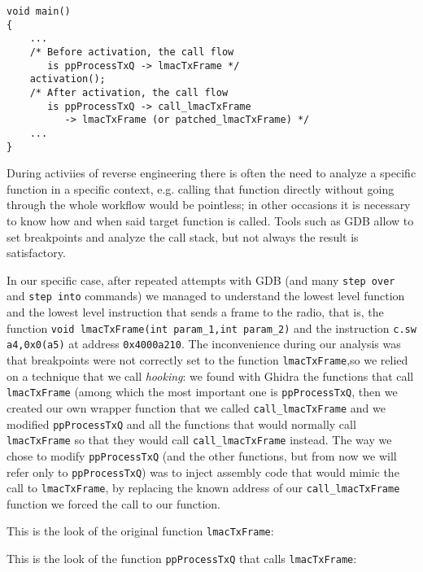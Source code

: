 \newsavebox\funmain
\begin{lrbox}{\funmain}
\begin{lstlisting}
void main()
{
    ...
    /* Before activation, the call flow
       is ppProcessTxQ -> lmacTxFrame */
    activation();
    /* After activation, the call flow
       is ppProcessTxQ -> call_lmacTxFrame
          -> lmacTxFrame (or patched_lmacTxFrame) */
    ...
}
\end{lstlisting}
\end{lrbox}


During activiies of reverse engineering there is often the need to analyze a specific function
in a specific context, e.g. calling that function directly without going through the whole
workflow would be pointless; in other occasions it is necessary to know how and when said target
function is called. Tools such as GDB allow to set breakpoints and analyze the call stack,
but not always the result is satisfactory.

In our specific case, after repeated attempts with GDB (and many \texttt{step over} and \texttt{step into} commands)
we managed to understand the lowest level function and the lowest level instruction that sends a frame to the radio,
that is, the function \texttt{void lmacTxFrame(int param\_1,int param\_2)} and the instruction \texttt{c.sw a4,0x0(a5)}
at address \texttt{0x4000a210}.
The inconvenience during our analysis was that breakpoints were not correctly set to the function \texttt{lmacTxFrame},so we relied on a technique that we call \textit{hooking}: we found with Ghidra the functions that call
\texttt{lmacTxFrame} (among which the most important one is \texttt{ppProcessTxQ}, then we created our own wrapper function that we called \texttt{call\_lmacTxFrame} and we 
modified \texttt{ppProcessTxQ} and all the functions that would normally call \texttt{lmacTxFrame}
so that they would call \texttt{call\_lmacTxFrame} instead. 
The way we chose to modify \texttt{ppProcessTxQ} (and the other functions, but from now we will refer only to
\texttt{ppProcessTxQ}) was to inject assembly code that would mimic the call to \texttt{lmacTxFrame},
by replacing the known address of our \texttt{call\_lmacTxFrame} function we forced the call to our function.

This is the look of the original function \texttt{lmacTxFrame}:

\usebox\funlmactxframe

This is the look of the function \texttt{ppProcessTxQ} that calls \texttt{lmacTxFrame}:

